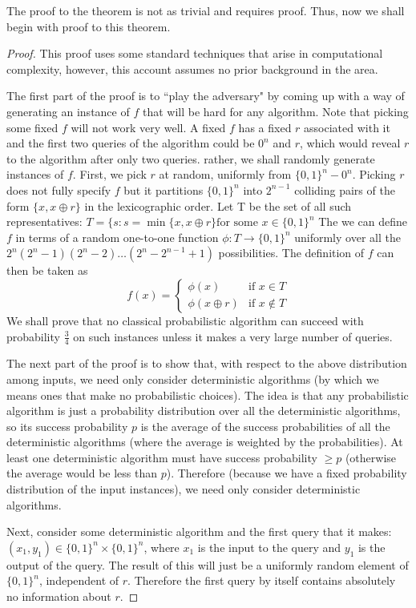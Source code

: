 \documentclass[12pt, oneside]{book}
\theoremstyle{definition}
\theoremstyle{definition}
\theoremstyle{remark}
\begin{document}
The proof to the theorem is not as trivial and requires proof. Thus, now we shall begin with proof to this theorem.
\begin{proof}
    This proof uses some standard techniques that arise in computational complexity, however, this account assumes no prior background in the area.

    The first part of the proof is to ``play the adversary" by coming up with a way of generating an instance of $f$ that will be hard for any algorithm. Note that picking some fixed $f$ will not work very well. A fixed $f$ has a fixed $r$ associated with it and the first two queries of the algorithm could be $0^n$ and $r$, which would reveal $r$ to the algorithm after only two queries. rather, we shall randomly generate instances of $f$. First, we pick $r$ at random, uniformly from $\{0,1\}^n -0^n$. Picking $r$ does not fully specify $f$ but it partitions $\{0,1\}^n$ into $2^{n-1}$ colliding pairs of the form $\{x,x\oplus r\}$ in the lexicographic order. Let T be the set of all such representatives: $T=\{s:s=\min \{x,x\oplus r\} \text{for some } x \in \{0,1\}^n$ The we can define $f$ in terms of a random one-to-one function $\phi:T\rightarrow \{0,1\}^n$ uniformly over all the $2^n(2^n-1)(2^n-2)\ldots(2^n-2^{n-1}+1)$ possibilities. The definition of $f$ can then be taken as
    \[
    f(x) = \begin{cases} \phi(x) & \text{if } x \in T \\ 
    \phi(x \oplus r) &\text{if } x \notin T \end{cases}
    \]
    We shall prove that no classical probabilistic algorithm can succeed with probability $\frac{3}{4}$ on such instances unless it makes a very large number of queries.

    The next part of the proof is to show that, with respect to the above distribution among inputs, we need only consider deterministic algorithms (by which we means ones that make no probabilistic choices). The idea is that any probabilistic algorithm is just a probability distribution over all the deterministic algorithms, so its success probability $p$ is the average of the success probabilities of all the deterministic algorithms (where the average is weighted by the probabilities). At least one deterministic algorithm must have success probability $\geq p$ (otherwise the average would be less than $p$). Therefore (because we have a fixed probability distribution of the input instances), we need only consider deterministic algorithms.

    Next, consider some deterministic algorithm and the first query that it makes: $(x_1,y_1) \in \{0,1\}^n \times \{0,1\}^n$, where $x_1$ is the input to the query and $y_1$ is the output of the query. The result of this will just be a uniformly random element of $\{0,1\}^n$, independent of $r$. Therefore the first query by itself contains absolutely no information about $r$.


\end{proof}
\end{document}
